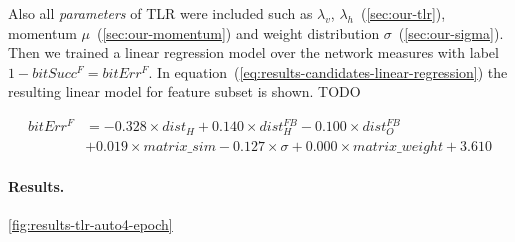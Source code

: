 Also all \emph{parameters} of TLR were included such as $\lambda_v$, $\lambda_h$~(\ref{sec:our-tlr}), momentum $\mu$~(\ref{sec:our-momentum}) and weight distribution $\sigma$~(\ref{sec:our-sigma}). Then we trained a linear regression model over the network measures with label $1-bitSucc^F = bitErr^F$. In equation~(\ref{eq:results-candidates-linear-regression}) the resulting linear model for feature subset is shown. TODO 

\begin{align} 
\label{eq:results-candidates-linear-regression} 
bitErr^F &= 
- 0.328 \times dist_{H}
+ 0.140 \times dist_{H}^{FB}
- 0.100 \times dist_{O}^{FB} \nonumber \\
&+ 0.019 \times matrix\_sim
- 0.127 \times \sigma
+ 0.000 \times matrix\_weight
+ 3.610
\end{align}  

\paragraph{Results.}
\label{sec:results-candidates} 

\ref{fig:results-tlr-auto4-epoch} 


